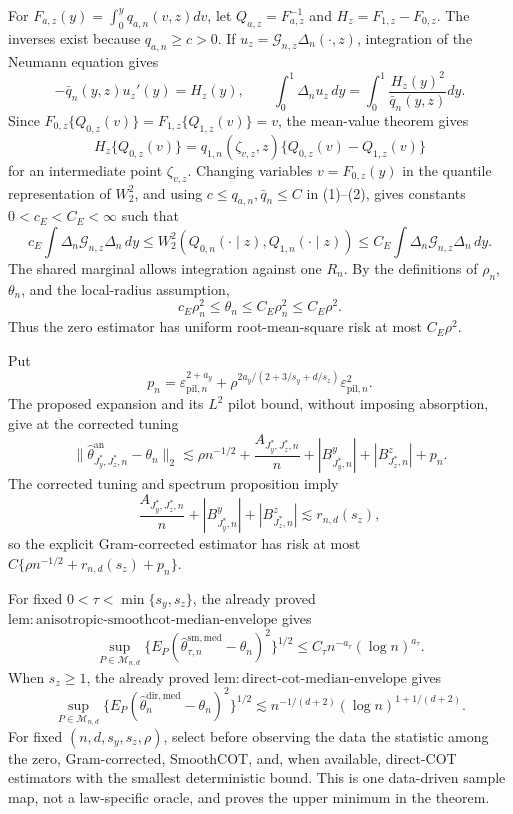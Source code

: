 For \(F_{a,z}(y)=\int_0^yq_{a,n}(v,z)dv\), let \(Q_{a,z}=F_{a,z}^{-1}\) and \(H_z=F_{1,z}-F_{0,z}\). The inverses exist because \(q_{a,n}\ge c>0\). If \(u_z=\mathcal G_{n,z}\Delta_n(\cdot,z)\), integration of the Neumann equation gives
\[
-\bar q_n(y,z)u_z'(y)=H_z(y),
\qquad
\int_0^1\Delta_nu_z\,dy=\int_0^1\frac{H_z(y)^2}{\bar q_n(y,z)}dy. \tag{1}
\]
Since \(F_{0,z}\{Q_{0,z}(v)\}=F_{1,z}\{Q_{1,z}(v)\}=v\), the mean-value theorem gives
\[
H_z\{Q_{0,z}(v)\}
=q_{1,n}(\zeta_{v,z},z)\{Q_{0,z}(v)-Q_{1,z}(v)\}                \tag{2}
\]
for an intermediate point \(\zeta_{v,z}\). Changing variables \(v=F_{0,z}(y)\) in the quantile representation of \(W_2^2\), and using \(c\le q_{a,n},\bar q_n\le C\) in (1)--(2), gives constants \(0<c_E<C_E<\infty\) such that
\[
c_E\int\Delta_n\mathcal G_{n,z}\Delta_n\,dy
\le W_2^2(Q_{0,n}(\cdot\mid z),Q_{1,n}(\cdot\mid z))
\le C_E\int\Delta_n\mathcal G_{n,z}\Delta_n\,dy.              \tag{3}
\]
The shared marginal allows integration against one \(R_n\). By the definitions of \(\rho_n\), \(\theta_n\), and the local-radius assumption,
\[
c_E\rho_n^2\le\theta_n\le C_E\rho_n^2\le C_E\rho^2.           \tag{4}
\]
Thus the zero estimator has uniform root-mean-square risk at most \(C_E\rho^2\).

Put
\[
p_n=\varepsilon_{\mathrm{pil},n}^{2+a_y}
+\rho^{2a_y/(2+3/s_y+d/s_z)}\varepsilon_{\mathrm{pil},n}^2.
\]
The proposed expansion and its \(L^2\) pilot bound, without imposing absorption, give at the corrected tuning
\[
\|\widehat\theta^{\mathrm{an}}_{J_y^*,J_z^*,n}-\theta_n\|_2
\lesssim\rho n^{-1/2}+\frac{A_{J_y^*,J_z^*,n}}n
+|B^y_{J_y^*,n}|+|B^z_{J_z^*,n}|+p_n.                           \tag{5}
\]
The corrected tuning and spectrum proposition imply
\[
\frac{A_{J_y^*,J_z^*,n}}n
+|B^y_{J_y^*,n}|+|B^z_{J_z^*,n}|\lesssim r_{n,d}(s_z),            \tag{6}
\]
so the explicit Gram-corrected estimator has risk at most \(C\{\rho n^{-1/2}+r_{n,d}(s_z)+p_n\}\).

For fixed \(0<\tau<\min\{s_y,s_z\}\), the already proved \(\mathrm{lem{:}anisotropic\text{-}smoothcot\text{-}median\text{-}envelope}\) gives
\[
\sup_{P\in\mathcal M_{n,d}}
\{E_P(\widehat\theta^{\mathrm{sm,med}}_{\tau,n}-\theta_n)^2\}^{1/2}
\le C_\tau n^{-a_\tau}(\log n)^{a_\tau}.                       \tag{7}
\]
When \(s_z\ge1\), the already proved \(\mathrm{lem{:}direct\text{-}cot\text{-}median\text{-}envelope}\) gives
\[
\sup_{P\in\mathcal M_{n,d}}
\{E_P(\widehat\theta_n^{\mathrm{dir,med}}-\theta_n)^2\}^{1/2}
\lesssim n^{-1/(d+2)}(\log n)^{1+1/(d+2)}.                      \tag{8}
\]
For fixed \((n,d,s_y,s_z,\rho)\), select before observing the data the statistic among the zero, Gram-corrected, SmoothCOT, and, when available, direct-COT estimators with the smallest deterministic bound. This is one data-driven sample map, not a law-specific oracle, and proves the upper minimum in the theorem.

